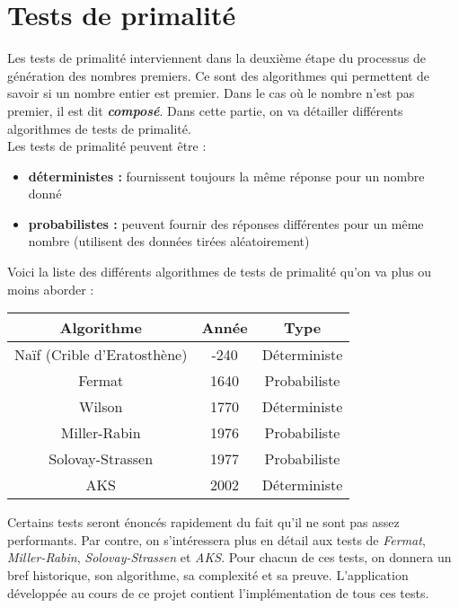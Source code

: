 \section{Tests de primalité}

	Les tests de primalité interviennent dans la deuxième étape du processus de génération des nombres premiers. Ce sont des algorithmes qui permettent de savoir si un nombre entier est premier. Dans le cas où le nombre n'est pas premier, il est dit \textbf{\textit{composé}}. Dans cette partie, on va détailler différents algorithmes de tests de primalité.\\
	Les tests de primalité peuvent être :
	\begin{itemize}[leftmargin=*]
		\item \textbf{déterministes :} fournissent toujours la même réponse pour un nombre donné
		\item \textbf{probabilistes :} peuvent fournir des réponses différentes pour un même nombre (utilisent des données tirées aléatoirement)
	\end{itemize}
	
	\noindent Voici la liste des différents algorithmes de tests de primalité qu'on va plus ou moins aborder :
	\begin{table}[H]\begin{center}
		\begin{tabular}{|c|c|c|}
		\hline
		Algorithme           & Année & Type       \\ \hline
		Naïf (Crible d’Eratosthène) & -240  & Déterministe \\ \hline
		Fermat               & 1640  & Probabiliste \\ \hline
		Wilson               & 1770  & Déterministe \\ \hline
		Miller-Rabin         & 1976  & Probabiliste \\ \hline
		Solovay-Strassen     & 1977  & Probabiliste \\ \hline
		AKS                  & 2002  & Déterministe \\ \hline
		\end{tabular}
	\end{center}\end{table}
	
	Certains tests seront énoncés rapidement du fait qu'il ne sont pas assez performants. Par contre, on s'intéressera plus en détail aux tests de \textit{Fermat}, \textit{Miller-Rabin}, \textit{Solovay-Strassen} et \textit{AKS}. Pour chacun de ces tests, on donnera un bref historique, son algorithme, sa complexité et sa preuve. L'application développée au cours de ce projet contient l'implémentation de tous ces tests.
	
	
	
	
	
	
	